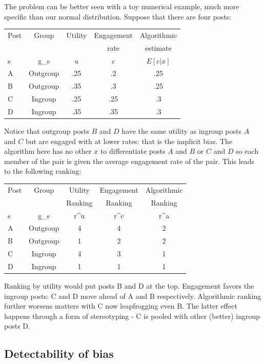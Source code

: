 \documentclass[12pt,letterpaper]{article}
\begin{document}
The problem can be better seen with  a toy numerical example, much more specific than our normal distribution. Suppose that there are four posts:
\begin{center}

\begin{tabular}{|l|c|c|c|c|}\hline
Post& Group & Utility & Engagement & Algorithmic\\ 
& & & rate & estimate\\\hline 
s&g_s & $u$& $c$ & $E[c|x]$\\\hline 
A & Outgroup & .25 & .2 &.25\\ \hline 
B & Outgroup & .35 &  .3&.25\\ \hline
C & Ingroup & .25 & .25& .3\\ \hline
D & Ingroup & .35 & .35& .3\\ \hline
\end{tabular}
\end{center}
Notice that outgroup posts $B$ and $D$ have the same utility as ingroup posts $A$ and $C$ but are engaged with at lower rates: that is the implicit bias.  The algorithm here has no other $x$ to differentiate posts $A$ and $B$ or $C$ and $D$ so each member of the pair is given the average engagement rate of the pair. This leads to the following ranking:
\begin{center}
    

\begin{tabular}{|l|c|c|c|c|}\hline
Post& Group & Utility & Engagement & Algorithmic\\ 
& &Ranking & Ranking & Ranking\\\hline 
s&g_s&r^{u}&r^{c}&r^{a}\\
A & Outgroup & 4 & 4 &2\\ \hline 
B & Outgroup & 1 &  2&2\\ \hline
C & Ingroup & 4 & 3& 1\\ \hline
D & Ingroup & 1 & 1& 1\\ \hline
\end{tabular}
\end{center}
Ranking by utility would put posts B and D at the top. Engagement favors the ingroup posts: C and D move ahead of A and B respectively. Algorithmic ranking further worsens matters with C now leapfrogging even B. The latter effect happens through a form of stereotyping - C is pooled with other (better) ingroup posts D. 

\subsection{Detectability of bias}
\end{document}
